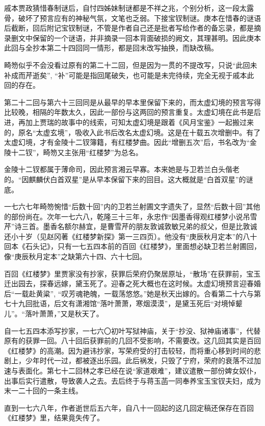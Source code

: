 \par 戚本贾政猜惜春制谜后，自忖四姊妹制谜都是不祥之兆，个别分析，这一段太露骨，破坏了预言应有的神秘气氛，文笔也乏弱。下接宝钗制谜。庚本在惜春的谜语后截断，回后附记宝钗制谜，不管是作者自己还是批者写给作者的备忘录，都是摘录删文中保留的一个谜语，并非摘录一回本背面破损的阙文，其理甚明。因此庚本此回与全抄本第二十四回同一情形，都是回末改写抽换，而缺改稿。
\par 畸笏似乎不会没看过原有的第二十二回，但是因为一贯的不提改写，只说“此回未补成而芹逝矣”, “补”可能是指回尾破失，也可能是未完待续，完全无视于戚本此回的存在。
\par 第二十二回与第六十三回同是从最早的早本里保留下来的，而太虚幻境的预言写得比较晚，相隔的年数太久，因此一部份与这两回的预言重复。太虚幻境在此书是后进，再加上贾瑞的故事中的线索，可知太虚幻境是跟着《风月宝鉴》一起搬过来的，原名“太虚玄境”，吸收入此书后改名太虚幻境。这是在十载五次增删中。有了太虚幻境，才有金陵十二钗簿籍，有红楼梦曲。因此“增删五次”后，书名改为“金陵十二钗”，畸笏又主张用“红楼梦”为总名。
\par 金陵十二钗都属于薄命司，因此预言湘云早寡。本来她是与卫若兰白头偕老的。“因麒麟伏白首双星”是从早本保留下来的回目。这大概就是“白首双星”的谜底。
\par 一七六七年畸笏惋惜“后数十回”内的卫若兰射圃文字遗失了，显然“后数十回”其他的部份尚在。次年一七六八，乾隆三十三年，永忠作“因墨香得观红楼梦小说吊雪芹”诗三首。墨香名额尔赫宜，是曹雪芹的朋友敦诚敦敏兄弟的叔父，但是比敦诚还小十岁（见赵冈著《红楼梦新探》第一三四页）。他没有“庚辰秋月定本”的八十回本《石头记》，只有一七五四本前的百回《红楼梦》，里面想必缺卫若兰射圃回，像“庚辰秋月定本”之缺第六十四、六十七回。
\par 百回《红楼梦》里贾家没有抄家，获罪后荣府仍聚居原址，“散场”在获罪前，宝玉迁出园去，探春远嫁，黛玉死了。迎春之死大概也在这时候。太虚幻境预言迎春婚后“一载赴黄粱”, “叹芳魂艳魄，一载荡悠悠。”她是秋天出嫁的。合看第二十六与第七十九回批语，后文有潇湘馆“落叶萧萧，寒烟漠漠”，是黛玉死后“对境悼颦儿”。“落叶萧萧，”又是秋天了。
\par 自一七五四本添写抄家，一七六〇初叶写狱神庙，关于“抄没、狱神庙诸事”，代替原有的获罪一回。八十回后获罪前的几回不受影响，不需要改。这几回其实是百回《红楼梦》的高潮。因为避讳抄家，写荣府受的打击较轻，而将重心移到时间的悲剧上，少年时代一过，都被逐出乐园。此后祸发，只毁了宁府，荣府的衰落不过加速与表面化。第七十二回林之孝已经在说“家道艰难”，建议遣散一部份婢女奴仆，出事后实行遣散，导致袭人之去。去后终于与蒋玉菡一同奉养宝玉宝钗夫妇，成为末一二十回的一条主线。
\par 直到一七六八年，作者逝世后五六年，自八十一回起的这几回定稿还保存在百回《红楼梦》里，结果竟失传了。
